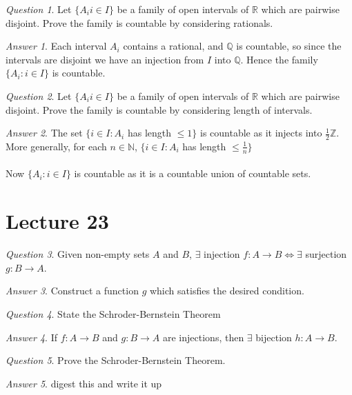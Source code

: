 \documentclass[]{article}
\def\naturals{\mathbb{N}}
\def\integers{\mathbb{Z}}
\def\rationals{\mathbb{Q}}
\def\reals{\mathbb{R}}
\theoremstyle{remark}
\theoremstyle{qnstyle}
\newtheorem{question}{Question}
\theoremstyle{answerstyle}
\newtheorem*{answer}{Answer}
\begin{document}
\begin{question}
    Let $\{A_i i \in I \}$ be a family of open intervals of $\reals$ which are
    pairwise disjoint. Prove the family is countable by considering rationals.
\end{question}
\begin{answer}
    Each interval $A_i$ contains a rational, and $\rationals$ is countable, so
    since the intervals are disjoint we have an injection from $I$ into $\rationals$.
    Hence the family $\{A_i:i \in I\}$ is countable.
\end{answer}

\begin{question}
    Let $\{A_i i \in I \}$ be a family of open intervals of $\reals$ which are
    pairwise disjoint. Prove the family is countable by considering length of intervals.
\end{question}
\begin{answer}
    The set $\{i \in I: A_i$ has length $\leq 1 \}$ is countable as it
    injects into $\frac{1}{2} \integers$.
    More generally, for each $n \in \naturals$, $\{i \in I: A_i$ has length $\leq \frac{1}{n} \}$
\\ \\
    Now $\{A_i: i \in I\}$ is countable as it is a countable union of
    countable sets.
\end{answer}





\section* {Lecture 23}

\begin{question}
    Given non-empty sets $A$ and $B$, $\exists$ injection $f: A \to B \iff \exists$
    surjection $g: B \to A$.  
\end{question}
\begin{answer}
    Construct a function $g$ which satisfies the desired condition.
\end{answer}

\begin{question}
    State the Schroder-Bernstein Theorem
\end{question}
\begin{answer}
    If $f: A \to B$ and $g: B \to A$ are injections, then $\exists$ bijection
    $h: A \to B$.
\end{answer}

\begin{question}
    Prove the Schroder-Bernstein Theorem.
\end{question}
\begin{answer}
    digest this and write it up
\end{answer}
\end{document}

